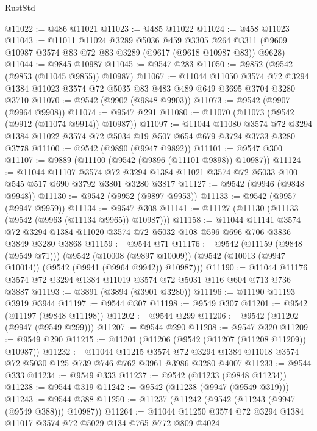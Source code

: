 \begin{lexlean}{RustStd}
\begin{coremodule}
{\begin{coremodule}
{{{{{{{{{{{{{{{{{{{{{{{{{{{{{{{{{@11022 := @486 @11021
@11023 := @485 @11022
@11024 := @458 @11023
@11043 := @11011
    @11024
    @3289
    @5036
    @459
    @3305
    @264
    @3311
    (@9609 @10987 @3574 @83 @72 @83 @3289 (@9617 (@9618 @10987 @83)) @9628)
@11044 := @9845 @10987
@11045 := @9547 @283
@11050 := @9852 (@9542 (@9853 (@11045 @9855)) @10987)
@11067 := @11044
    @11050
    @3574
    @72
    @3294
    @1384
    @11023
    @3574
    @72
    @5035
    @83
    @483
    @489
    @649
    @3695
    @3704
    @3280
    @3710
@11070 := @9542 (@9902 (@9848 @9903))
@11073 := @9542 (@9907 (@9964 @9908))
@11074 := @9547 @291
@11080 := @11070 (@11073 (@9542 (@9912 (@11074 @9914)) @10987))
@11097 := @11044
    @11080
    @3574
    @72
    @3294
    @1384
    @11022
    @3574
    @72
    @5034
    @19
    @507
    @654
    @679
    @3724
    @3733
    @3280
    @3778
@11100 := @9542 (@9890 (@9947 @9892))
@11101 := @9547 @300
@11107 := @9889 (@11100 (@9542 (@9896 (@11101 @9898)) @10987))
@11124 := @11044
    @11107
    @3574
    @72
    @3294
    @1384
    @11021
    @3574
    @72
    @5033
    @100
    @545
    @517
    @690
    @3792
    @3801
    @3280
    @3817
@11127 := @9542 (@9946 (@9848 @9948))
@11130 := @9542 (@9952 (@9897 @9953))
@11133 := @9542 (@9957 (@9947 @9959))
@11134 := @9547 @308
@11141 := @11127 (@11130 (@11133 (@9542 (@9963 (@11134 @9965)) @10987)))
@11158 := @11044
    @11141
    @3574
    @72
    @3294
    @1384
    @11020
    @3574
    @72
    @5032
    @108
    @596
    @696
    @706
    @3836
    @3849
    @3280
    @3868
@11159 := @9544 @71
@11176 := @9542
    (@11159 (@9848 (@9549 @71)))
    (@9542
      (@10008 (@9897 @10009))
      (@9542 (@10013 (@9947 @10014)) (@9542 (@9941 (@9964 @9942)) @10987)))
@11190 := @11044 @11176 @3574 @72 @3294 @1384 @11019 @3574 @72 @5031 @116 @604 @713 @736 @3887
@11193 := @3891 (@3894 (@3901 @3280))
@11196 := @11190 @11193 @3919 @3944
@11197 := @9544 @307
@11198 := @9549 @307
@11201 := @9542 (@11197 (@9848 @11198))
@11202 := @9544 @299
@11206 := @9542 (@11202 (@9947 (@9549 @299)))
@11207 := @9544 @290
@11208 := @9547 @320
@11209 := @9549 @290
@11215 := @11201 (@11206 (@9542 (@11207 (@11208 @11209)) @10987))
@11232 := @11044
    @11215
    @3574
    @72
    @3294
    @1384
    @11018
    @3574
    @72
    @5030
    @125
    @739
    @746
    @762
    @3961
    @3986
    @3280
    @4007
@11233 := @9544 @333
@11234 := @9549 @333
@11237 := @9542 (@11233 (@9848 @11234))
@11238 := @9544 @319
@11242 := @9542 (@11238 (@9947 (@9549 @319)))
@11243 := @9544 @388
@11250 := @11237 (@11242 (@9542 (@11243 (@9947 (@9549 @388))) @10987))
@11264 := @11044 @11250 @3574 @72 @3294 @1384 @11017 @3574 @72 @5029 @134 @765 @772 @809 @4024
}}}}}}}}}}}}}}}}}}}}}}}}}}}}}}}}}
\end{coremodule}}
\end{coremodule}
\end{lexlean}
